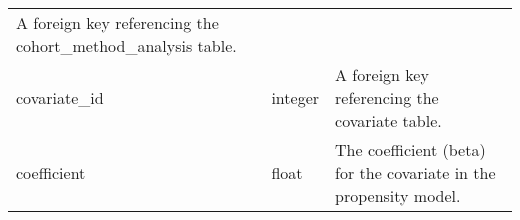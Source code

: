\documentclass[
]{article}
\begin{document}
\begin{longtable}[]{@{}lll@{}}
\begin{minipage}[t]{0.50\columnwidth}
A foreign key referencing the cohort\_method\_analysis table.\strut
\end{minipage}\tabularnewline
\begin{minipage}[t]{0.23\columnwidth}\raggedright
covariate\_id\strut
\end{minipage} & \begin{minipage}[t]{0.18\columnwidth}\raggedright
integer\strut
\end{minipage} & \begin{minipage}[t]{0.50\columnwidth}\raggedright
A foreign key referencing the covariate table.\strut
\end{minipage}\tabularnewline
\begin{minipage}[t]{0.23\columnwidth}\raggedright
coefficient\strut
\end{minipage} & \begin{minipage}[t]{0.18\columnwidth}\raggedright
float\strut
\end{minipage} & \begin{minipage}[t]{0.50\columnwidth}\raggedright
The coefficient (beta) for the covariate in the propensity model.\strut
\end{minipage}\tabularnewline
\bottomrule
\end{longtable}
\end{document}
